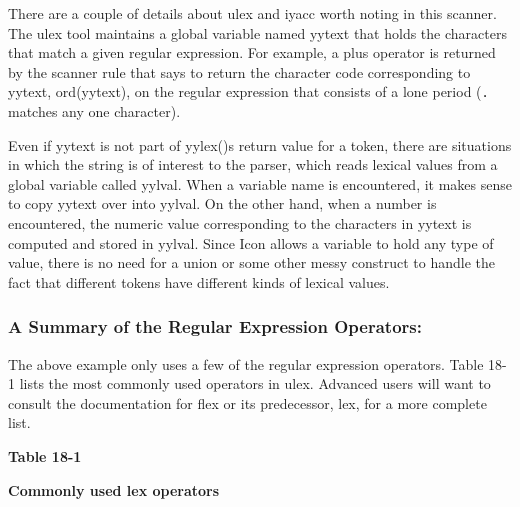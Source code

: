 There are a couple of details about \textsf{ulex} and \textsf{iyacc}
worth noting in this scanner. The \textsf{ulex} tool maintains a global
variable named \textsf{yytext} that holds the characters that match a
given regular expression. For example, a plus operator is returned by
the scanner rule that says to return the character code corresponding
to \textsf{yytext}, \textsf{ord(yytext)}, on the regular expression
that consists of a lone period (\texttt{.} matches any one character).

Even if \textsf{yytext} is not part of
\textsf{yylex()}{\textquotesingle}s return value for a token, there are
situations in which the string is of interest to the parser, which
reads lexical values from a global variable called \textsf{yylval}.
When a variable name is encountered, it makes sense to copy
\textsf{yytext} over into \textsf{yylval}. On the other hand, when a
number is encountered, the numeric value corresponding to the
characters in \textsf{yytext} is computed and stored in
\textsf{yylval}. Since Icon allows a variable to hold any type of
value, there is no need for a union or some other messy construct to
handle the fact that different tokens have different kinds of lexical
values.

\subsubsection{A Summary of the Regular Expression Operators:}

The above example only uses a few of the regular expression operators.
Table 18-1 lists the most commonly used operators in \textsf{ulex}.
Advanced users will want to consult the documentation for \textsf{flex}
or its predecessor, \textsf{lex}, for a more complete list.

\vspace{0.16in}

{\centering\sffamily\bfseries
Table 18-1
\par}

{\centering\sffamily\bfseries
Commonly used lex operators
\par}


